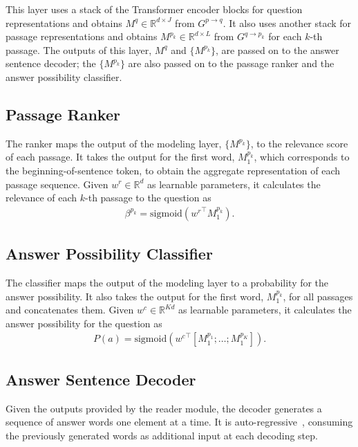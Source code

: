 \documentclass[11pt,a4paper]{article}
\theoremstyle{mydef}
\theoremstyle{myprob}
\begin{document}
This layer uses a stack of the Transformer encoder blocks for question representations and obtains $M^q \in \mathbb{R}^{d \times J}$ from $G^{p \rightarrow q}$. It also uses another stack for passage representations and obtains $M^{p_k} \in \mathbb{R}^{d \times L}$ from $G^{q \rightarrow p_k}$ for each $k$-th passage. The outputs of this layer, $M^q$ and $\{M^{p_k}\}$, are passed on to the answer sentence decoder; the $\{M^{p_k}\}$ are also passed on to the passage ranker and the answer possibility classifier.

\subsection{Passage Ranker}
\label{sec:ranker}

The ranker maps the output of the modeling layer,  $\{M^{p_k}\}$, to the relevance score of each passage. 
It takes the output for the first word, $M^{p_k}_1$, which corresponds to the beginning-of-sentence token, to obtain the aggregate representation of each passage sequence.
Given $w^r \in \mathbb{R}^{d}$ as learnable parameters, it calculates the relevance of each $k$-th passage to the question as
\begin{align}
\nonumber
\beta^{p_k} = \mathrm{sigmoid}({w^r}^\top M^{p_k}_1).
\end{align}

\subsection{Answer Possibility Classifier}
\label{sec:classifier}

The classifier maps the output of the modeling layer %
to a probability for the answer possibility. It also takes the output for the first word, $M^{p_k}_1$, for all passages and concatenates them. 
Given $w^c \in \mathbb{R}^{Kd}$ as learnable parameters,
it calculates the answer possibility for the question as
\begin{align}
\nonumber
P(a) = \mathrm{sigmoid}({w^c}^\top [M^{p_1}_1; \ldots; M^{p_K}_1]).
\end{align}

\subsection{Answer Sentence Decoder}
\label{sec:decoder}

Given the outputs 
provided by the reader module, 
the decoder generates a sequence of answer words one element at a time. It is auto-regressive~\citep{Graves13}, consuming the previously generated words as additional input at each decoding step.
\end{document}

